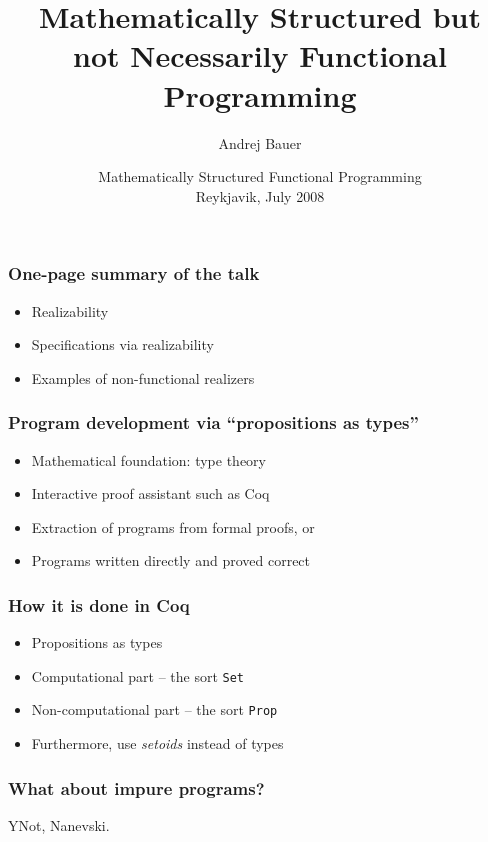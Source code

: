 \documentclass[t]{beamer}
\title{Mathematically Structured but\\
not Necessarily Functional Programming}
\author{Andrej Bauer}
\institute{Department of Mathematics and Physics\\
  University of Ljubljana, Slovenia}
\date{Mathematically Structured Functional Programming\\Reykjavik, July 2008}
\begin{document}
\begin{frame}
  \titlepage
\end{frame}

\begin{frame}
  \frametitle{One-page summary of the talk}

  \begin{itemize}
  \item Realizability
  \item Specifications via realizability
  \item Examples of non-functional realizers
  \end{itemize}
\end{frame}

\begin{frame}
  \frametitle{Program development via ``propositions as types''}

  \begin{itemize}
  \item Mathematical foundation: type theory
  \item Interactive proof assistant such as Coq
  \item Extraction of programs from formal proofs, or
  \item Programs written directly and proved correct
  \end{itemize}
\end{frame}

\begin{frame}
  \frametitle{How it is done in Coq}

  \begin{itemize}
  \item Propositions as types
  \item Computational part -- the sort \texttt{Set}
  \item Non-computational part -- the sort \texttt{Prop}
  \item Furthermore, use \emph{setoids} instead of types
  \end{itemize}

\end{frame}

\begin{frame}
  \frametitle{What about impure programs?}

  YNot, Nanevski.
\end{frame}
\end{document}
